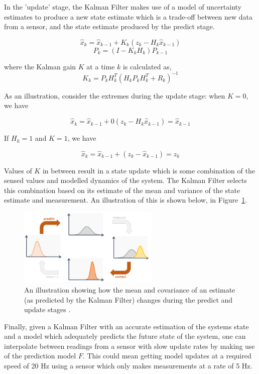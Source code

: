 In the 'update' stage, the Kalman Filter makes use of a model of uncertainty estimates to produce a new state estimate which is a trade-off between new data from a sensor, and the state estimate produced by the predict stage.

\[ \hat{x}_k = \hat{x}_{k-1} + K_k (z_k - H_k \hat{x}_{k-1}) \]
\[ P_k = (I - K_k H_k) P_{k-1} \]

where the Kalman gain $K$ at a time $k$ is calculated as,
\[ K_k = P_k H_k^T (H_k P_k H_k^T + R_k)^{-1} \]

As an illustration, consider the extremes during the update stage: when $K = 0$, we have

\[ \hat{x}_k = \hat{x}_{k-1} + 0 (z_k - H_k \hat{x}_{k-1}) = \hat{x}_{k-1} \]

If $H_k = 1$ and $K = 1$, we have

\[ \hat{x}_k = \hat{x}_{k-1} + (z_k - \hat{x}_{k-1}) = z_k \]

Values of $K$ in between result in a state update which is some combination of the sensed values and modelled dynamics of the system. The Kalman Filter selects this combination based on its estimate of the mean and variance of the state estimate and measurement. An illustration of this is shown below, in Figure~\ref{fig:kalman_filter_loop}.

\begin{figure}[h!]
  \centering
  \includegraphics[width=0.6\textwidth]{literature_review/kalman_filter_loop}
  \caption{\label{fig:kalman_filter_loop}An illustration showing how the mean and covariance of an estimate (as predicted by the Kalman Filter) changes during the predict and update stages \cite{website:kalman_visualisation}.}
\end{figure}


Finally, given a Kalman Filter with an accurate estimation of the systems state and a model which adequately predicts the future state of the system, one can interpolate between readings from a sensor with slow update rates by making use of the prediction model $F$. This could mean getting model updates at a required speed of 20 Hz using a sensor which only makes measurements at a rate of 5 Hz.


